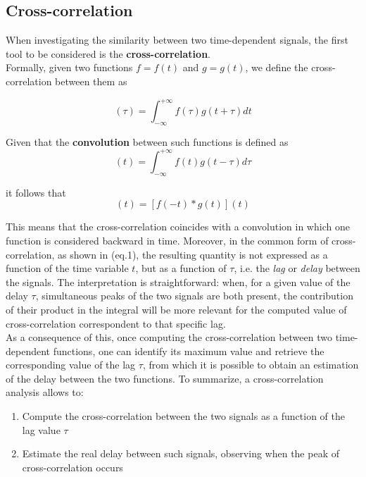 \documentclass[a4paper]{article}
\begin{document}
\subsection{Cross-correlation}

When investigating the similarity between two time-dependent signals, the first tool to be considered is the \textbf{cross-correlation}.\\
Formally, given two functions $ f = f(t)$ and $ g = g(t)$, we define the cross-correlation between them as

\begin{equation}
[f(t) \star g(t)] (\tau) = \int_{-\infty}^{+\infty} f(\tau)g(t+\tau) dt 
\end{equation}


Given that the \textbf{convolution} between such functions is defined as 
\begin{equation}
[f(t) * g (t)](t) = \int_{-\infty}^{+\infty} f(t) g (t-\tau) d\tau
\end{equation}

it follows that
\begin{equation}
[f(t) \star g(t)](t) = [f(-t) * g (t)](t) 
\end{equation}

This means that the cross-correlation coincides with a convolution in which one function is considered backward in time. Moreover, in the common form of cross-correlation, as shown in (eq.1), the resulting quantity is not expressed as a function of the time variable $t$, but as a function of $\tau$, i.e. the \textit{lag} or \textit{delay} between the signals. The interpretation is straightforward: when, for a given value of the delay $\tau$, simultaneous peaks of the two signals are both present, the contribution of their product in the integral will be more relevant for the computed value of cross-correlation correspondent to  that specific lag.\\
As a consequence of this, once computing the cross-correlation between two time-dependent functions, one can identify its maximum value and retrieve the corresponding value of the lag $\tau$, from which it is possible to obtain an estimation of the delay between the two functions. To summarize, a cross-correlation analysis allows to:
\begin{enumerate}
	\item Compute the cross-correlation between the two signals as a function of the lag value  $\tau$
	
	\item Estimate the real delay between such signals, observing when the peak of cross-correlation occurs
\end{enumerate}
\end{document}
